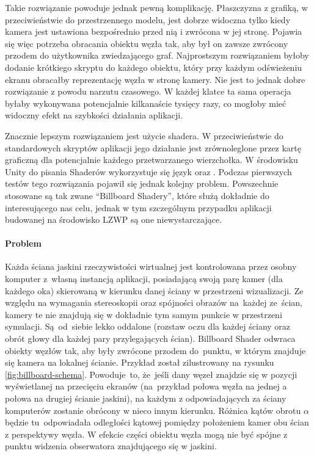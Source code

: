 
Takie rozwiązanie powoduje jednak pewną komplikację. Płaszczyzna z grafiką, w przeciwieństwie do przestrzennego modelu, jest dobrze widoczna tylko kiedy kamera jest ustawiona bezpośrednio przed nią i zwrócona w jej stronę. Pojawia się więc potrzeba obracania obiektu węzła tak, aby był on zawsze zwrócony przodem do użytkownika zwiedzającego graf. Najprostszym rozwiązaniem byłoby dodanie krótkiego skryptu do każdego obiektu, który przy każdym odświeżeniu ekranu obracałby reprezentację węzła w stronę kamery. Nie jest to jednak dobre rozwiązanie z powodu narzutu czasowego. W każdej klatce ta sama operacja byłaby wykonywana potencjalnie kilkanaście tysięcy razy, co mogłoby mieć widoczny efekt na szybkości działania aplikacji.

Znacznie lepszym rozwiązaniem jest użycie shadera. W przeciwieństwie do standardowych skryptów aplikacji jego działanie jest zrównoleglone przez kartę graficzną dla potencjalnie każdego przetwarzanego wierzchołka. W środowisku Unity do pisania Shaderów wykorzystuje się język  oraz  \cite{UnityShaders}. Podczas pierwszych testów tego rozwiązania pojawił się jednak kolejny problem. Powszechnie stosowane są tak zwane ``Billboard Shadery'', które służą dokładnie do interesującego nas celu, jednak w tym szczególnym przypadku aplikacji budowanej na środowisko LZWP są one niewystarczające. 

\paragraph{Problem} Każda ściana jaskini rzeczywistości wirtualnej jest kontrolowana przez osobny komputer z~własną instancją aplikacji, posiadającą swoją parę kamer (dla każdego oka) skierowaną w kierunku danej ściany w przestrzeni wizualizacji. Ze względu na wymagania stereoskopii oraz spójności obrazów na~każdej ze~ścian, kamery te nie znajdują się w dokładnie tym samym punkcie w przestrzeni symulacji. Są~od~siebie lekko oddalone (rozstaw oczu dla każdej ściany oraz obrót głowy dla każdej pary przylegających ścian). Billboard Shader odwraca obiekty węzłów tak, aby były zwrócone przodem do~punktu, w którym znajduje się kamera na lokalnej ścianie. Przykład został zilustrowany na rysunku \ref{fig:billboard-schema}. Powoduje~to, że~jeśli dany węzeł znajdzie się w pozycji wyświetlanej na przecięciu ekranów (na~przykład połowa węzła na jednej a połowa na drugiej ścianie jaskini), na każdym z odpowiadających za ściany komputerów zostanie obrócony w nieco innym kierunku. Różnica kątów obrotu \(\alpha\) będzie tu~odpowiadała odległości kątowej pomiędzy położeniem kamer obu ścian z perspektywy węzła. W efekcie części obiektu węzła mogą nie być spójne z punktu widzenia obserwatora znajdującego się w jaskini.

